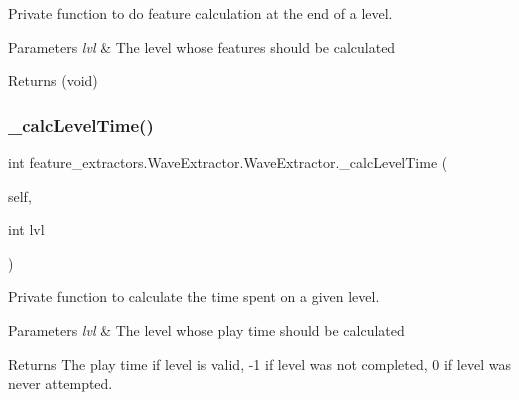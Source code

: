 Private function to do feature calculation at the end of a level. 


\begin{DoxyParams}{Parameters}
{\em lvl} & The level whose features should be calculated \\
\hline
\end{DoxyParams}
\begin{DoxyReturn}{Returns}
(void) 
\end{DoxyReturn}
\mbox{\label{classfeature__extractors_1_1_wave_extractor_1_1_wave_extractor_a3f90f055668095294fd59984e43c11ff}} 
\subsubsection{\texorpdfstring{\_calcLevelTime()}{\_calcLevelTime()}}
{\footnotesize\ttfamily  int feature\+\_\+extractors.\+Wave\+Extractor.\+Wave\+Extractor.\+\_\+calc\+Level\+Time (\begin{DoxyParamCaption}\item[{}]{self,  }\item[{int}]{lvl }\end{DoxyParamCaption})\hspace{0.3cm}{\ttfamily [private]}}



Private function to calculate the time spent on a given level. 


\begin{DoxyParams}{Parameters}
{\em lvl} & The level whose play time should be calculated \\
\hline
\end{DoxyParams}
\begin{DoxyReturn}{Returns}
The play time if level is valid, -\/1 if level was not completed, 0 if level was never attempted. 
\end{DoxyReturn}
\mbox{\label{classfeature__extractors_1_1_wave_extractor_1_1_wave_extractor_a4cfb4cc348b8bcb8882137482f684d8c}} 
